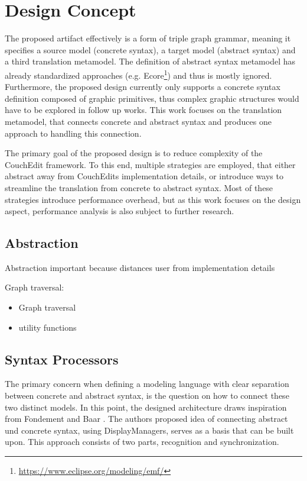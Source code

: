 \chapter{Design Concept}
\label{chap:design}
The proposed artifact effectively is a form of triple graph grammar, meaning it specifies a source model (concrete syntax), a target model (abstract syntax) and a third translation metamodel. The definition of abstract syntax metamodel has already standardized approaches (e.g. Ecore\footnote{\url{https://www.eclipse.org/modeling/emf/}}) and thus is mostly ignored. Furthermore, the proposed design currently only supports a concrete syntax definition composed of graphic primitives, thus complex graphic structures would have to be explored in follow up works. This work focuses on the translation metamodel, that connects concrete and abstract syntax and produces one approach to handling this connection.

The primary goal of the proposed design is to reduce complexity of the CouchEdit framework. To this end, multiple strategies are employed, that either abstract away from CouchEdits implementation details, or introduce ways to streamline the translation from concrete to abstract syntax. Most of these strategies introduce performance overhead, but as this work focuses on the design aspect, performance analysis is also subject to further research. 

\section{Abstraction}
Abstraction important because distances user from implementation details



Graph traversal: 

\begin{itemize}
  \item Graph traversal
  \item utility functions
\end{itemize}



\section{Syntax Processors}
The primary concern when defining a modeling language with clear separation between concrete and abstract syntax, is the question on how to connect these two distinct models. In this point, the designed architecture draws inspiration from Fondement and Baar \cite{fondement_making_2005}. The authors proposed idea of connecting abstract und concrete syntax, using DisplayManagers, serves as a basis that can be built upon. This approach consists of two parts, recognition and synchronization. 

